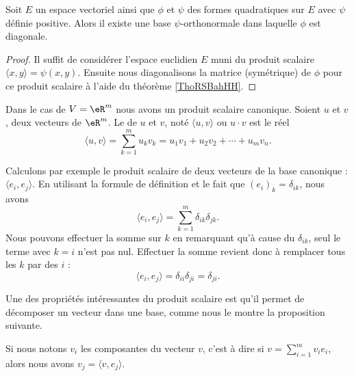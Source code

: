 \begin{corollary}   \label{CorSMHpoVK}
    Soit \( E\) un espace vectoriel ainsi que \( \phi\) et \( \psi\) des formes quadratiques sur \( E\) avec \( \psi\) définie positive. Alors il existe une base \( \psi\)-orthonormale dans laquelle \( \phi\) est diagonale.
\end{corollary}

\begin{proof}
    Il suffit de considérer l'espace euclidien \( E\) muni du produit scalaire \( \langle x, y\rangle =\psi(x,y)\). Ensuite nous diagonalisons la matrice (symétrique) de \( \phi\) pour ce produit scalaire à l'aide du théorème \ref{ThoRSBahHH}.
\end{proof}

\begin{definition}      \label{DefYNWUFc}
    Dans le cas de \( V=\eR^m\) nous avons un produit scalaire canonique. Soient $u$ et $v$, deux vecteurs de $\eR^m$. Le  de $u$ et $v$, noté $\langle u, v\rangle $ ou $u\cdot v$ est le réel
	\begin{equation}		\label{EqDefProdScalsumii}
		\langle u, v\rangle =\sum_{k=1}^m u_kv_k=u_1v_1+u_2v_2+\cdots+u_mv_n.
	\end{equation}
\end{definition}

Calculons par exemple le produit scalaire de deux vecteurs de la base canonique : $\langle e_i, e_j\rangle $. En utilisant la formule de définition et le fait que $(e_i)_k=\delta_{ik}$, nous avons
\begin{equation}
	\langle e_i, e_j\rangle =\sum_{k=1}^m\delta_{ik}\delta_{jk}.
\end{equation}
Nous pouvons effectuer la somme sur $k$ en remarquant qu'à cause du $\delta_{ik}$, seul le terme avec $k=i$ n'est pas nul. Effectuer la somme revient donc à remplacer tous les $k$ par des $i$ :
\begin{equation}
	\langle e_i, e_j\rangle =\delta_{ii}\delta_{ji}=\delta_{ji}.
\end{equation}

Une des propriétés intéressantes du produit scalaire est qu'il permet de décomposer un vecteur dans une base, comme nous le montre la proposition suivante.

\begin{proposition}		\label{PropScalCompDec}
	Si nous notons $v_i$ les composantes du vecteur $v$, c'est à dire si $v=\sum_{i=1}^m v_ie_i$, alors nous avons $v_j=\langle v, e_j\rangle $.
\end{proposition}

